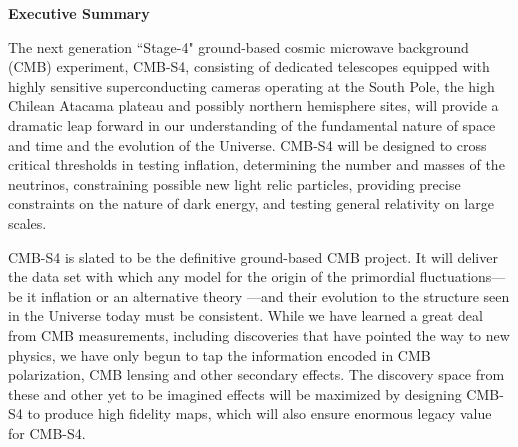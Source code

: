 \begin{center}
  {\Large \bf Executive Summary}
\end{center}

The next generation ``Stage-4" ground-based cosmic microwave background (CMB) experiment, CMB-S4, consisting of dedicated telescopes equipped with highly sensitive superconducting cameras operating at the South Pole, the high Chilean Atacama plateau and possibly northern hemisphere sites, will provide a dramatic leap forward in our understanding of the fundamental nature of space and time and the evolution of the Universe. CMB-S4 will be designed to cross critical thresholds in testing inflation, determining the number and masses of the neutrinos, constraining possible new light relic particles, providing precise constraints on the nature of dark energy, and testing general relativity on large scales. 

CMB-S4 is slated to be the definitive ground-based CMB project. It will deliver the data set with which any model for the origin of the primordial fluctuations--- be it inflation or an alternative theory ---and their evolution to the structure seen in the Universe today must be consistent. %
While we have learned a great deal from CMB measurements, including discoveries that have pointed the way to new physics, we have only begun to tap the information encoded in CMB polarization, CMB lensing and other secondary effects.  The discovery space from these and other yet to be imagined effects will be  maximized by designing CMB-S4 to produce high fidelity maps, which will also ensure enormous legacy value for CMB-S4.


